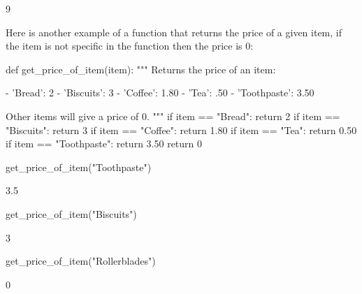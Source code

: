 \begin{raw}
9
\end{raw}





Here is another example of a function that returns the price of a given item, if
the item is not specific in the function then the price is 0:




\begin{pyin}
def get_price_of_item(item):
    """
    Returns the price of an item:

    - 'Bread': 2
    - 'Biscuits': 3
    - 'Coffee': 1.80
    - 'Tea': .50
    - 'Toothpaste': 3.50

    Other items will give a price of 0.
    """
    if item == "Bread":
        return 2
    if item == "Biscuits":
        return 3
    if item == "Coffee":
        return 1.80
    if item == "Tea":
        return 0.50
    if item == "Toothpaste":
        return 3.50
    return 0
\end{pyin}







\begin{pyin}
get_price_of_item("Toothpaste")
\end{pyin}





\begin{raw}
3.5
\end{raw}







\begin{pyin}
get_price_of_item("Biscuits")
\end{pyin}





\begin{raw}
3
\end{raw}







\begin{pyin}
get_price_of_item("Rollerblades")
\end{pyin}





\begin{raw}
0
\end{raw}





